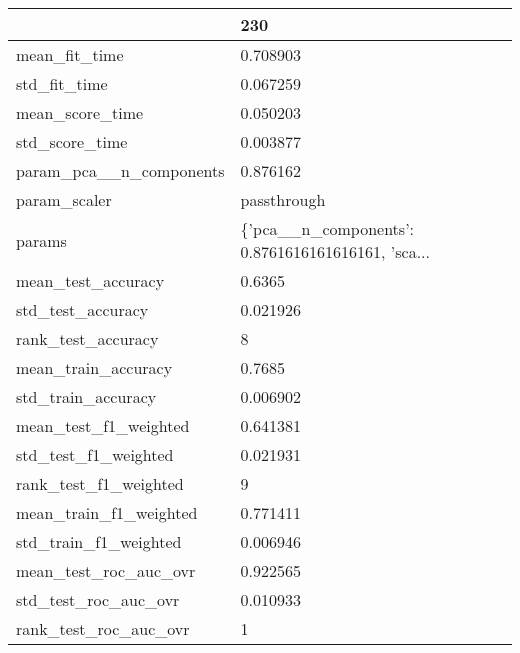 \begin{tabular}{ll}
\toprule
{} &                                                230 \\
\midrule
mean\_fit\_time               &                                           0.708903 \\
std\_fit\_time                &                                           0.067259 \\
mean\_score\_time             &                                           0.050203 \\
std\_score\_time              &                                           0.003877 \\
param\_pca\_\_n\_components     &                                           0.876162 \\
param\_scaler                &                                        passthrough \\
params                      &  \{'pca\_\_n\_components': 0.8761616161616161, 'sca... \\
mean\_test\_accuracy          &                                             0.6365 \\
std\_test\_accuracy           &                                           0.021926 \\
rank\_test\_accuracy          &                                                  8 \\
mean\_train\_accuracy         &                                             0.7685 \\
std\_train\_accuracy          &                                           0.006902 \\
mean\_test\_f1\_weighted       &                                           0.641381 \\
std\_test\_f1\_weighted        &                                           0.021931 \\
rank\_test\_f1\_weighted       &                                                  9 \\
mean\_train\_f1\_weighted      &                                           0.771411 \\
std\_train\_f1\_weighted       &                                           0.006946 \\
mean\_test\_roc\_auc\_ovr       &                                           0.922565 \\
std\_test\_roc\_auc\_ovr        &                                           0.010933 \\
rank\_test\_roc\_auc\_ovr       &                                                  1 \\

\end{tabular}
